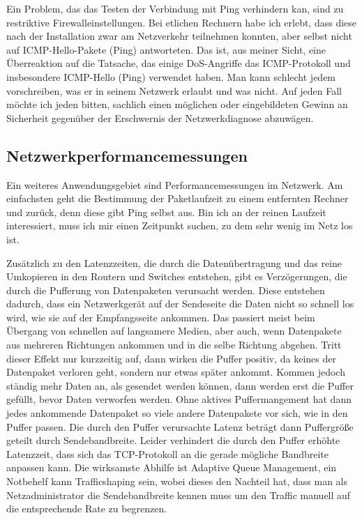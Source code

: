 \begin{normaltext}
  Ein Problem, das das Testen der Verbindung mit Ping verhindern kan, sind zu
  restriktive Firewalleinstellungen. Bei etlichen Rechnern habe ich erlebt,
  dass diese nach der Installation zwar am Netzverkehr teilnehmen konnten,
  aber selbst nicht auf ICMP-Hello-Pakete (Ping) antworteten. Das ist, aus
  meiner Sicht, eine Überreaktion auf die Tatsache, das einige DoS-Angriffe
  das ICMP-Protokoll und insbesondere ICMP-Hello (Ping) verwendet haben. Man
  kann schlecht jedem vorschreiben, was er in seinem Netzwerk erlaubt und was
  nicht. Auf jeden Fall möchte ich jeden bitten, sachlich einen möglichen oder
  eingebildeten Gewinn an Sicherheit gegenüber der Erschwernis der
  Netzwerkdiagnose abzuwägen.

  \subsection{Netzwerkperformancemessungen}
  Ein weiteres Anwendungsgebiet sind Performancemessungen im Netzwerk. Am
  einfachsten geht die Bestimmung der Paketlaufzeit zu einem entfernten
  Rechner und zurück, denn diese gibt Ping selbst aus. Bin ich an der reinen
  Laufzeit interessiert, muss ich mir einen Zeitpunkt suchen, zu dem sehr
  wenig im Netz los ist.

  Zusätzlich zu den Latenzzeiten, die durch die Datenübertragung und das
  reine Umkopieren in den Routern und Switches entstehen, gibt es
  Verzögerungen, die durch die Pufferung von Datenpaketen verursacht werden.
  Diese entstehen dadurch, dass ein Netzwerkgerät auf der Sendeseite die Daten
  nicht so schnell los wird, wie sie auf der Empfangsseite ankommen. Das
  passiert meist beim Übergang von schnellen auf langsamere Medien, aber auch,
  wenn Datenpakete aus mehreren Richtungen ankommen und in die selbe Richtung
  abgehen. Tritt dieser Effekt nur kurzzeitig auf, dann wirken die Puffer
  positiv, da keines der Datenpaket verloren geht, sondern nur etwas später
  ankommt. Kommen jedoch ständig mehr Daten an, als gesendet werden können,
  dann werden erst die Puffer gefüllt, bevor Daten verworfen werden. Ohne
  aktives Puffermangement hat dann jedes ankommende Datenpaket so viele andere
  Datenpakete vor sich, wie in den Puffer passen. Die durch den Puffer
  verursachte Latenz beträgt dann Puffergröße geteilt durch Sendebandbreite.
  Leider verhindert die durch den Puffer erhöhte Latenzzeit, dass sich das
  TCP-Protokoll an die gerade mögliche Bandbreite anpassen kann. Die
  wirksamste  Abhilfe ist Adaptive Queue Management, ein Notbehelf kann
  Trafficshaping sein, wobei dieses den Nachteil hat, dass man als
  Netzadministrator die Sendebandbreite kennen muss um den Traffic manuell auf
  die entsprechende Rate zu begrenzen.


\end{normaltext}
